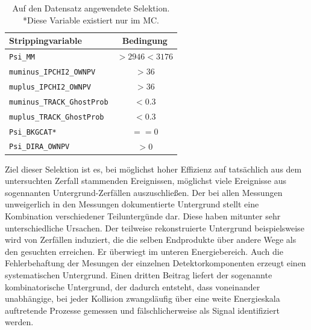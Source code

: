 \begin{table}[htb]
  \centering
  \caption{Auf den Datensatz angewendete Selektion. *Diese Variable existiert nur im MC.}
  \begin{tabular}{lc}
    \toprule
    Strippingvariable                 & Bedingung      \\
    \midrule
    \texttt{Psi\_MM}                  & $>\num{2946}<\num{3176}$  \\
    \texttt{muminus\_IPCHI2\_OWNPV}   & $>\num{36}$  \\
    \texttt{muplus\_IPCHI2\_OWNPV}    & $>\num{36}$  \\
    \texttt{muminus\_TRACK\_GhostProb}& $<\num{0.3}$ \\
    \texttt{muplus\_TRACK\_GhostProb} & $<\num{0.3}$ \\
    \texttt{Psi\_BKGCAT*}             & $==\num{0}$  \\
    \texttt{Psi\_DIRA\_OWNPV}         & $>\num{0}$  \\
    \bottomrule
  \end{tabular}
  \label{tab:strip}
\end{table}

Ziel dieser Selektion ist es, bei möglichst hoher Effizienz auf tatsächlich aus dem untersuchten Zerfall stammenden Ereignissen, möglichst viele Ereignisse aus sogennanten Untergrund-Zerfällen auszuschließen. Der bei allen Messungen unweigerlich in den Messungen dokumentierte Untergrund stellt eine Kombination verschiedener Teiluntergünde dar. Diese haben mitunter sehr unterschiedliche Ursachen. Der teilweise rekonstruierte Untergrund beispielsweise wird von Zerfällen induziert, die die selben Endprodukte über andere Wege als den gesuchten erreichen. Er überwiegt im unteren Energiebereich. Auch die Fehlerbehaftung der Mesungen der einzelnen Detektorkomponenten erzeugt einen systematischen Untergrund. Einen dritten Beitrag liefert der sogenannte kombinatorische Untergrund, der dadurch entsteht, dass voneinander unabhängige, bei jeder Kollision zwangsläufig über eine weite Energieskala auftretende Prozesse gemessen und fälschlicherweise als Signal identifiziert werden.

